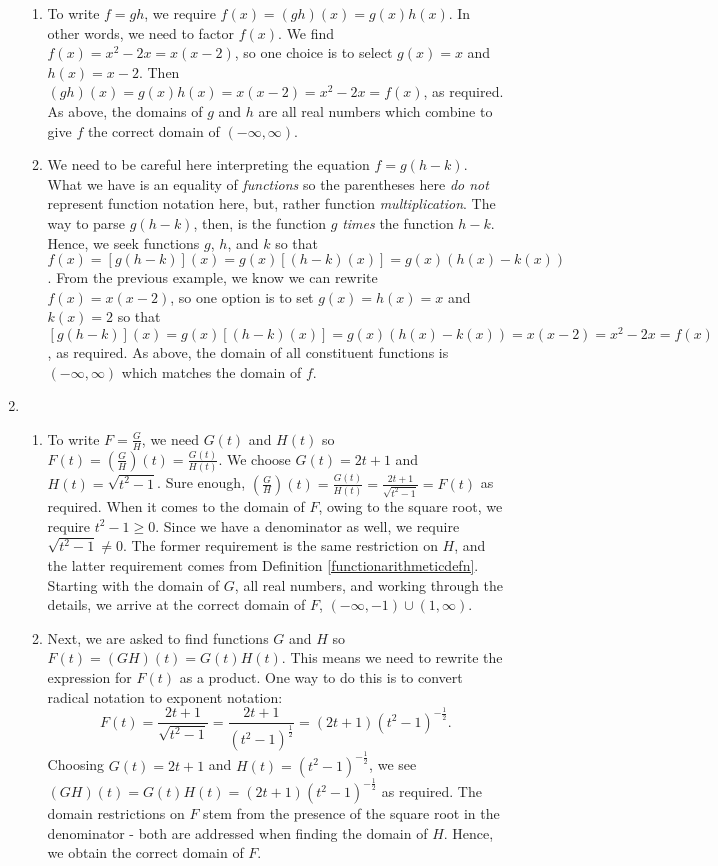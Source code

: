 \begin{ex}
\begin{enumerate}
\begin{enumerate}
\item  To write $f = gh$, we require $f(x) = (gh)(x) = g(x) h(x)$.  In other words, we need to factor $f(x)$.  We find $f(x) = x^2-2x = x(x-2)$, so one choice is to select $g(x) = x$ and $h(x) = x-2$.  Then $(gh)(x) = g(x)h(x) = x(x-2) = x^2-2x = f(x)$, as required.  As above, the domains of $g$ and $h$ are all real numbers which combine to give $f$ the correct domain of $(-\infty, \infty)$.

\item  We need to be careful here interpreting the equation $f = g(h-k)$.  What we have is an equality of \textit{functions} so the parentheses here \textit{do not} represent function notation here, but, rather function \textit{multiplication}.  The way to parse $g(h-k)$, then, is the function $g$ \textit{times} the function $h-k$. Hence, we seek functions $g$, $h$, and $k$ so that $f(x) = [g(h-k)](x) = g(x) [(h-k)(x)] = g(x) (h(x) - k(x))$.    From the previous example, we know we can rewrite $f(x) = x(x-2)$, so one option is to set $g(x) = h(x) = x$ and $k(x) = 2$ so that $[g(h-k)](x)  =  g(x) [(h-k)(x)]  =  g(x) (h(x) - k(x)) = x(x-2) = x^2-2x = f(x)$, as required.  As above, the domain of all constituent functions is $(-\infty, \infty)$ which matches the domain of $f$.


\end{enumerate}

\item  \begin{enumerate}

\item To write $F = \frac{G}{H}$, we need $G(t)$ and $H(t)$ so $F(t)= \left(\frac{G}{H}\right)(t) = \frac{G(t)}{H(t)}$. We choose $G(t) = 2t+1$ and $H(t) = \sqrt{t^2-1}$.  Sure enough, $ \left(\frac{G}{H}\right)(t) = \frac{G(t)}{H(t)} = \frac{2t+1}{ \sqrt{t^2-1}} = F(t)$ as required.  When it comes to the domain of $F$, owing to the square root, we require $t^2-1 \geq 0$.  Since we have a denominator  as well, we require $\sqrt{t^2-1} \neq 0$. The former requirement is the same restriction on $H$, and the latter requirement comes from Definition \ref{functionarithmeticdefn}. Starting with the domain of $G$, all real numbers, and working through the details, we arrive at the correct domain of $F$, $(-\infty, -1) \cup (1, \infty)$.

\item  Next, we are asked to find functions $G$ and $H$ so $F (t) = (GH)(t)  = G(t) H(t)$.  This means we need to rewrite the expression for $F(t)$ as a product. One way to do this is to convert radical notation to exponent notation:  \[ F(t) = \dfrac{2t+1}{\sqrt{t^2-1}} = \dfrac{2t+1}{\left(t^2-1 \right)^{\frac{1}{2}}} = (2t+1) \left(t^2-1\right)^{-\frac{1}{2}}. \] Choosing $G(t) = 2t+1$ and $H(t) = \left(t^2-1\right)^{-\frac{1}{2}}$, we see $(GH)(t)  = G(t) H(t) = (2t+1) \left(t^2-1\right)^{-\frac{1}{2}}$ as required.  The domain restrictions on $F$ stem from the presence of the square root in the denominator - both are addressed when finding the domain of $H$.  Hence, we obtain the correct domain of $F$.


\end{enumerate}
\end{enumerate}
\end{ex}
